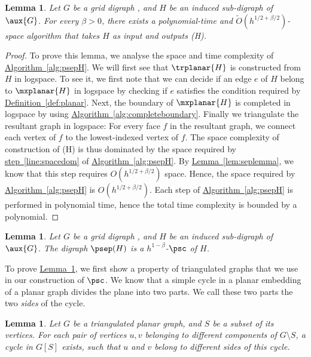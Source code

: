 \documentclass[11pt]{article}
\numberwithin{equation}{section}
\newtheorem{lemma}[theorem]{Lemma}
\theoremstyle{definition}
\theoremstyle{plain}
\newcommand{\expref}[2]{\hyperref[#2]{#1~\ref{#2}}}
\begin{document}
\begin{lemma}\label{lem:psepcomplexity}
Let $G$ be a grid %
digraph %
, and $H$ be %
an%
 induced  %
sub-digraph %
 of $\aux{G}$. For every $\beta > 0$, there exists a polynomial-time %
and $\tilde{O}(h^{1/2 + \beta/2})$-space  %
algorithm that takes $H$ as input and outputs \psep(H).
\end{lemma}
\begin{proof}
  To prove this lemma, we analyse the space and time complexity of 
\expref{Algorithm}{alg:psepH}. We will first see that $\trplanar{H}$ %
is %
 constructed from $H$ in logspace. To see it, we first note that we can decide if an edge $e$ of $H$ belong to $\mxplanar{H}$ in logspace by checking if $e$ satisfies the condition required by \expref{Definition}{def:planar}. Next, the boundary of $\mxplanar{H}$ %
is %
 completed in logspace by using \expref{Algorithm}{alg:completeboundary}. Finally we triangulate the resultant graph in logspace: For every face $f$ in the resultant graph, we connect each vertex of $f$ to the lowest-indexed vertex of $f$. The space complexity of construction of \psep(H) is thus dominated by the space required by \expref{step}{line:spacedom} of \expref{Algorithm}{alg:psepH}. By \expref{Lemma}{lem:seplemma}, we know that this step requires $O(h^{1/2 + \beta/2})$ space. Hence, the space required by \expref{Algorithm}{alg:psepH} is $O(h^{1/2 + \beta/2})$. Each step of \expref{Algorithm}{alg:psepH} %
is %
 performed in polynomial time, hence the total time complexity is bounded by a polynomial.
\end{proof}

\begin{lemma}
\label{lem:psep}
Let $G$ be a grid %
digraph %
, and $H$ be %
an%
induced  %
sub-digraph %
 of $\aux{G}$. The %
digraph %
 $\psep(H)$ is a $h^{1-\beta}$-$\psc$ of $H$.
\end{lemma}
To prove \expref{Lemma}{lem:psep}, we first show a property of triangulated graphs that we use in our construction of $\psc$. We know that a simple cycle in a planar embedding of a planar graph divides the plane into two parts. We call these two parts the two \emph{sides} of the cycle.

\begin{lemma}
\label{lem:sepfamily}
Let $G$ be a triangulated planar graph, and $S$ be a subset of its vertices. For each pair of vertices $u, v$ belonging to different components of $G \setminus S$, a cycle in $G[S]$ exists, such that $u$ and $v$ belong to different sides of this cycle.
\end{lemma}
\end{document}
